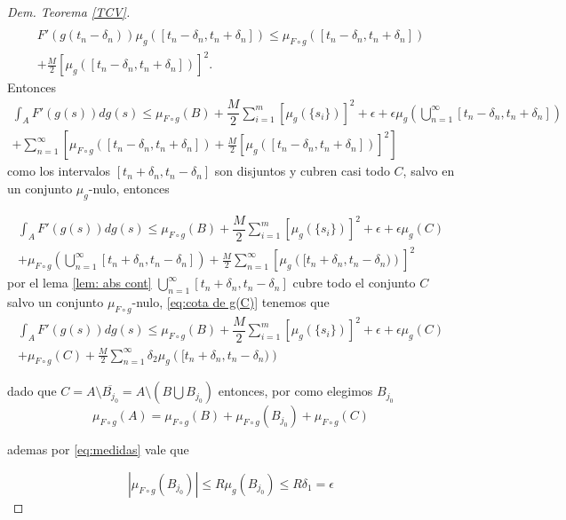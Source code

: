 \begin{proof}[Dem. Teorema \eqref{TCV}]
\begin{multline*}
\end{multline*}
\begin{multline*}
F'(g(t_n-\delta_n))\mu_{g}([t_n-\delta_n,t_n+\delta_n] )\leq \mu_{F\circ g}\left( [t_n-\delta_n,t_n+\delta_n]\right)\\ +\frac{M}{2}\left[\mu_{g}\left( [t_n-\delta_n,t_n+\delta_n]\right) \right]^2.
\end{multline*}
Entonces
\begin{multline*}
		\int_{A}F'(g(s))dg(s) \leq \mu_{F\circ g}(B)+\dfrac{M}{2}\sum_{i=1}^{m} \left[ \mu_{g}(\{s_i\})\right]^2+\epsilon+\epsilon\mu_{g}\left(\bigcup_{n=1}^{\infty}[t_n-\delta_n, t_n+\delta_n]\right) \\+ \sum_{n=1}^{\infty}\left[ \mu_{F\circ g}\left( [t_n-\delta_n,t_n+\delta_n]\right) +\frac{M}{2}\left[\mu_{g}\left( [t_n-\delta_n,t_n+\delta_n]\right) \right]^2 \right] 
\end{multline*}
como los intervalos $[t_n+\delta_n,t_n-\delta_n]$ son disjuntos y cubren casi todo $C$, salvo en un conjunto $\mu_g$-nulo, entonces

\begin{multline*}
	\int_{A}F'(g(s))dg(s) \leq \mu_{F\circ g}(B)+\dfrac{M}{2}\sum_{i=1}^{m} \left[ \mu_{g}(\{s_i\})\right] ^2+\epsilon+\epsilon\mu_{g}\left(C\right) \\+ \mu_{F\circ g}\left(\bigcup_{n=1}^{\infty} [t_n+\delta_n,t_n-\delta_n]\right) +\frac{M}{2}
	\sum_{n=1}^{\infty}\left[\mu_{g}\left( [t_n+\delta_n,t_n-\delta_n)\right) \right]^2 
\end{multline*} 
por el lema \ref{lem: abs cont}  $\bigcup_{n=1}^{\infty} [t_n+\delta_n,t_n-\delta_n]$ cubre todo el conjunto $C$ salvo un conjunto $\mu_{F\circ g}$-nulo, \ref{eq:cota de g(C)} tenemos que 
\begin{multline*}
	\int_{A}F'(g(s))dg(s) \leq \mu_{F\circ g}(B)+\dfrac{M}{2}\sum_{i=1}^{m} \left[ \mu_{g}(\{s_i\})\right] ^2+\epsilon+\epsilon\mu_{g}\left(C\right) \\+ \mu_{F\circ g}\left(C\right) +\frac{M}{2}
	\sum_{n=1}^{\infty}\delta_2 \mu_{g}\left( [t_n+\delta_n,t_n-\delta_n)\right)
\end{multline*} 

dado que  $C=A\setminus\overline{B_{j_0}}=A\setminus(B\bigcup B_{j_0})$ entonces, por como elegimos $B_{j_0}$ $$\mu_{F\circ g}(A)=\mu_{F\circ g}(B)+\mu_{F\circ g}(B_{j_0})+\mu_{F\circ g}(C)$$

 ademas por \ref{eq:medidas} vale que 
 
 $$\left| \mu_{F\circ g}(B_{j_0})\right| \leq R \mu_{g}(B_{j_0}) \leq R\delta_1=\epsilon$$ 
 

\end{proof}
